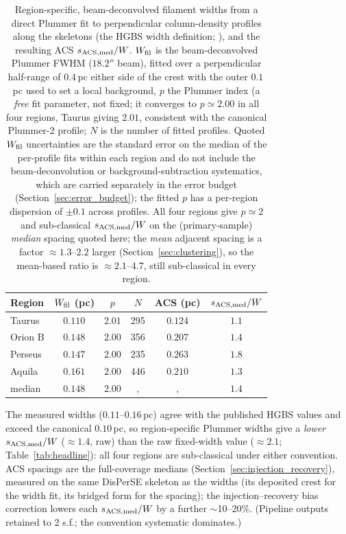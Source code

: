 \documentclass[usenatbib,twoside,twocolumn]{mnras}
\begin{document}
\begin{table}
\caption{Region-specific, beam-deconvolved filament widths from a direct Plummer fit to perpendicular column-density profiles along the skeletons (the HGBS width definition; \citealt{Arzoumanian2019}), and the resulting ACS $s_{\rm ACS,med}/W$. $W_{\rm fil}$ is the beam-deconvolved Plummer FWHM ($18.2''$ beam), fitted over a perpendicular half-range of $0.4$\,pc either side of the crest with the outer $0.1$\,pc used to set a local background, $p$ the Plummer index (a \emph{free} fit parameter, not fixed; it converges to $p\simeq2.00$ in all four regions, Taurus giving $2.01$, consistent with the canonical Plummer-2 profile; $N$ is the number of fitted profiles. Quoted $W_{\rm fil}$ uncertainties are the standard error on the median of the per-profile fits within each region and do not include the beam-deconvolution or background-subtraction systematics, which are carried separately in the error budget (Section~\ref{sec:error_budget}); the fitted $p$ has a per-region dispersion of $\pm0.1$ across profiles. All four regions give $p\simeq2$ and sub-classical $s_{\rm ACS,med}/W$ on the (primary-sample) \emph{median} spacing quoted here; the \emph{mean} adjacent spacing is a factor $\approx1.3$--$2.2$ larger (Section~\ref{sec:clustering}), so the mean-based ratio is $\approx2.1$--$4.7$, still sub-classical in every region.}
\label{tab:widths}
\footnotesize
\setlength{\tabcolsep}{3pt}
\begin{tabular}{p{1.7cm}ccccc}
\toprule
Region & $W_{\rm fil}$ (pc) & $p$ & $N$ & ACS (pc) & $s_{\rm ACS,med}/W$ \\
\midrule
Taurus  & $0.110$ & $2.01$ & 295 & $0.124$ & $1.1$ \\
Orion B & $0.148$ & $2.00$ & 356 & $0.207$ & $1.4$ \\
Perseus & $0.147$ & $2.00$ & 235 & $0.263$ & $1.8$ \\
Aquila  & $0.161$ & $2.00$ & 446 & $0.210$ & $1.3$ \\
\midrule
median  & $0.148$ & $2.00$ &, &, & $1.4$ \\
\bottomrule
\end{tabular}
\par\vspace{2pt}
\footnotesize The measured widths ($0.11$--$0.16$\,pc) agree with the published HGBS values and exceed the canonical $0.10$\,pc, so region-specific Plummer widths give a \emph{lower} $s_{\rm ACS,med}/W$ ($\approx1.4$, raw) than the raw fixed-width value ($\approx2.1$; Table~\ref{tab:headline}): all four regions are sub-classical under either convention. ACS spacings are the full-coverage medians (Section~\ref{sec:injection_recovery}), measured on the same DisPerSE skeleton as the widths (its deposited crest for the width fit, its bridged form for the spacing); the injection--recovery bias correction lowers each $s_{\rm ACS,med}/W$ by a further $\sim$10--20\%. (Pipeline outputs retained to 2 s.f.; the convention systematic dominates.)
\end{table}
\label{sec:decoder}
\end{document}
